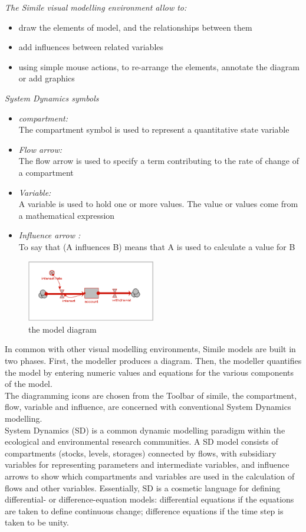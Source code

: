 \emph{The Simile visual modelling environment allow to:}
\begin{itemize}
	\item draw the elements of model, and the relationships between them
	\item add influences between related variables
	\item using simple mouse actions, to re-arrange the elements, annotate the diagram or add graphics
\end{itemize}	
	
\emph{System Dynamics symbols}
\begin{itemize}
	\item \emph{compartment:}\\
The compartment symbol is used to represent a quantitative state variable
	\item \emph{Flow arrow:}\\
The flow arrow is used to specify a term contributing to the rate of change of a compartment
	\item \emph{Variable:}\\
A variable is used to hold one or more values. The value or values come from a mathematical expression
	\item \emph{Influence arrow :}\\
To say that (A influences B) means that A is used to calculate a value for B
\end{itemize}	

\begin{figure}[htbp]
\centering
\includegraphics[width=0.5\textwidth]{pics/account_example.png}
\caption{the model diagram}
\label{fig:the model diagram}	
\end{figure}

In common with other visual modelling environments, Simile models are built in two phases. First, the modeller produces a diagram. Then, the modeller quantifies the model by entering numeric values and equations for the various components of the model.\\
The diagramming icons are chosen from the Toolbar of simile, the compartment, flow, variable and influence, are concerned with conventional System Dynamics modelling.\\
System Dynamics (SD) is a common dynamic modelling paradigm within the ecological and environmental research communities. A SD model consists of compartments (stocks, levels, storages) connected by flows, with subsidiary variables for representing parameters and intermediate variables, and influence arrows to show which compartments and variables are used in the calculation of flows and other variables. Essentially, SD is a cosmetic language for defining differential- or difference-equation models: differential equations if the equations are taken to define continuous change; difference equations if the time step is taken to be unity.


